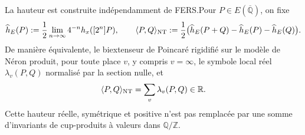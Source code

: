 \begin{proposition}
La hauteur est construite indépendamment de FERS.\@ Pour
$P\in E(\overline{\mathbb Q})$, on fixe
\begin{equation}\label{eq:pdf2-bsd-altura-canonica-construida}
 \widehat h_E(P):=
 \frac12\lim_{n\to\infty}4^{-n}h_x([2^n]P),
 \qquad
 \langle P,Q\rangle_{\rm NT}:=
 \frac12\bigl(\widehat h_E(P+Q)-\widehat h_E(P)-\widehat h_E(Q)\bigr).
\end{equation}
De manière équivalente, le biextenseur de Poincaré rigidifié sur le modèle de
Néron produit, pour toute place $v$, y compris $v=\infty$, le symbole local
réel $\lambda_v(P,Q)$ normalisé par la section nulle, et
\begin{equation}\label{eq:pdf2-bsd-altura-neron-local-global}
 \langle P,Q\rangle_{\rm NT}
 =\sum_v\lambda_v(P,Q)\in\mathbb R.
\end{equation}
Cette hauteur réelle, symétrique et positive n'est pas remplacée par une somme
d'invariants de cup-produits à valeurs dans $\mathbb Q/\mathbb Z$.


\end{proposition}
